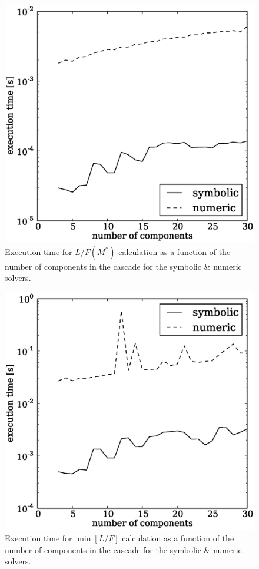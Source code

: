 \documentclass[preprint,12pt]{elsarticle}
\begin{document}
\begin{figure}[htpb]
\begin{center}
\includegraphics[scale=0.5]{solver_exec_times.eps}
\caption{Execution time for $L/F(M^*)$ calculation as a function of the number of 
    components in the cascade for the symbolic \& numeric solvers.}
\label{solver_exec_times_fig}
\end{center}
\end{figure}

\begin{figure}[htpb]
\begin{center}
\includegraphics[scale=0.5]{min_exec_times.eps}
\caption{Execution time for $\min\left[L/F\right]$ calculation as a function 
    of the number of 
    components in the cascade for the symbolic \& numeric solvers.}
\label{min_exec_times_fig}
\end{center}
\end{figure}
\end{document}
